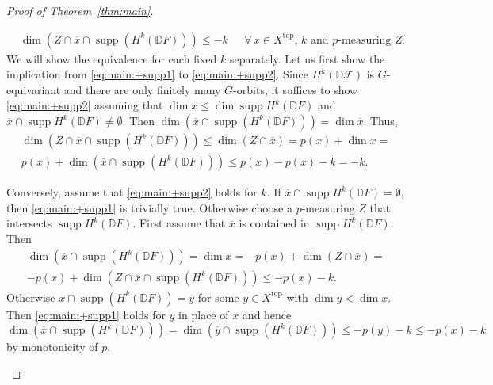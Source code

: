 \documentclass{compositio}
\theoremstyle{plain}
\theoremstyle{definition}
\theoremstyle{remark}
\newcommand\sheaf{\mathcal}
\newcommand\supp{\operatorname{supp}}
\newcommand\dualize{\mathbb D}
\begin{document}
\begin{proof}[Proof of Theorem~\ref{thm:main}]
\begin{enumerate}
\begin{align}
        \label{eq:main:+supp2}%
        & \dim\left( Z \cap  \overline x \cap  \supp\left( H^k(\dualize F) \right) \right) \leq  - k & \text{ $\forall\, x \in  X^{\mathrm{top}}$, $k$ and $p$-measuring $Z$}.
    \end{align}
    We will show the equivalence for each fixed $k$ separately.
    Let us first show the implication from \eqref{eq:main:+supp1} to \eqref{eq:main:+supp2}.
    Since $H^k(\dualize \sheaf F)$ is $G$-equivariant and there are only finitely many $G$-orbits, it suffices to show \eqref{eq:main:+supp2} assuming that $\dim x \le \dim \supp H^k(\dualize F)$ and $\overline x \cap \supp H^k(\dualize F) \ne \emptyset$.
    Then $\dim\left(\overline x \cap  \supp\left( H^k(\dualize F) \right)\right) = \dim \overline x$.
    Thus,
    \begin{multline*}
        \dim\left(Z \cap  \overline x \cap  \supp\left( H^k(\dualize F) \right) \right) \le
        \dim(Z \cap  \overline x) =
        p(x) + \dim x = \\
        p(x) + \dim\left(\overline x \cap  \supp\left( H^k(\dualize F) \right)\right) \le
        p(x) - p(x) - k
        = -k.
    \end{multline*}
    
    Conversely, assume that \eqref{eq:main:+supp2} holds for $k$.
    If $\overline x \cap \supp H^k(\dualize F) = \emptyset$, then \eqref{eq:main:+supp1} is trivially true.
    Otherwise choose a $p$-measuring $Z$ that intersects $\supp H^k(\dualize F)$.
    First assume that $\overline x$ is contained in $\supp H^k(\dualize F)$.
    Then
    \begin{multline*}
        \dim\left(\overline x \cap  \supp\left( H^k(\dualize F) \right)\right) =
        \dim x =
        -p(x) + \dim(Z \cap  \overline x) = \\
        -p(x) + \dim\left(Z \cap  \overline x \cap  \supp\left( H^k(\dualize F) \right) \right) \le
        -p(x) - k.
    \end{multline*}
    Otherwise $\overline x \cap  \supp\left( H^k(\dualize F) \right) = \overline y$ for some $y \in  X^{\mathrm{top}}$ with $\dim y < \dim x$.
    Then \eqref{eq:main:+supp1} holds for $y$ in place of $x$ and hence
    \[
    \dim\left( \overline x \cap  \supp\left( H^k(\dualize F) \right) \right) =
    \dim\left( \overline y \cap  \supp\left( H^k(\dualize F) \right) \right) \leq 
    -p(y) - k \leq 
    -p(x) - k
    \]
    by monotonicity of $p$.
    \qedhere
\end{enumerate}
\end{proof}
\end{document}
